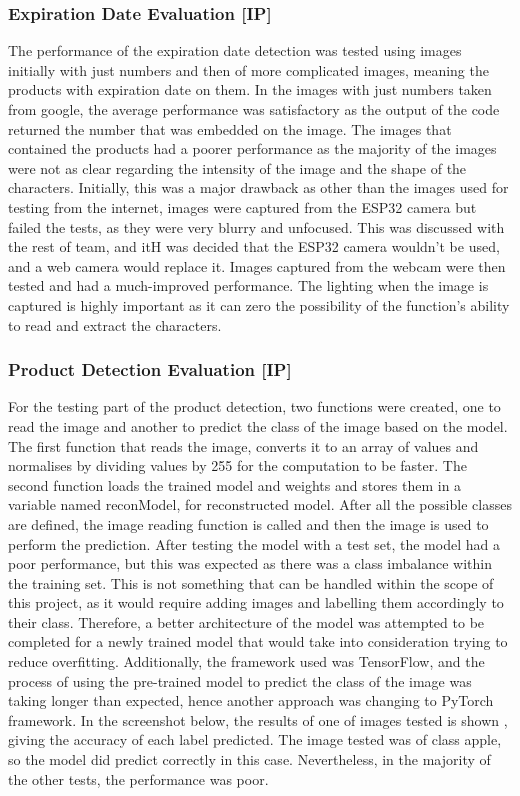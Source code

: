 \subsubsection{Expiration Date Evaluation [IP]}
The performance of the expiration date detection was tested using images initially with just numbers and then of more complicated images, meaning the products with expiration date on them.
In the images with just numbers taken from google, the average performance was satisfactory as the output of the code returned the number that was embedded on the image.
The images that contained the products had a poorer performance as the majority of the images were not as clear regarding the intensity of the image and the shape of the characters.
Initially, this was a major drawback as other than the images used for testing from the internet, images were captured from the ESP32 camera but failed the tests, as they were very blurry and unfocused.
This was discussed with the rest of team, and itH was decided that the ESP32 camera wouldn't be used, and a web camera would replace it.
Images captured from the webcam were then tested and had a much-improved performance.
The lighting when the image is captured is highly important as it can zero the possibility of the function's ability to read and extract the characters.

\subsubsection{Product Detection Evaluation [IP]}
For the testing part of the product detection, two functions were created, one to read the image and another to predict the class of the image based on the model.
The first function that reads the image, converts it to an array of values and normalises by dividing values by 255 for the computation to be faster.
The second function loads the trained model and weights and stores them in a variable named reconModel, for reconstructed model.
After all the possible classes are defined, the image reading function is called and then the image is used to perform the prediction.
After testing the model with a test set, the model had a poor performance, but this was expected as there was a class imbalance within the training set.
This is not something that can be handled within the scope of this project, as it would require adding images and labelling them accordingly to their class.
Therefore, a better architecture of the model was attempted to be completed for a newly trained model that would take into consideration trying to reduce overfitting.
Additionally, the framework used was TensorFlow, and the process of using the pre-trained model to predict the class of the image was taking longer than expected, hence another approach was changing to PyTorch framework.
In the screenshot below, the results of one of images tested is shown , giving the accuracy of each label predicted.
The image tested was of class apple, so the model did predict correctly in this case.
Nevertheless, in the majority of the other tests, the performance was poor.

